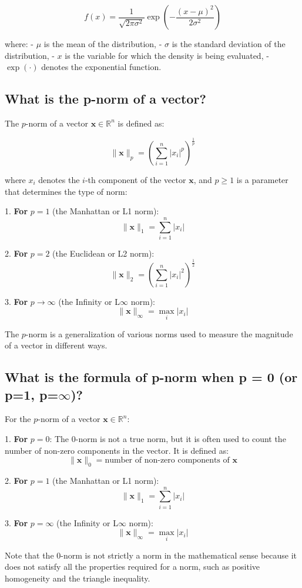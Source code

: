\[
f(x) = \frac{1}{\sqrt{2 \pi \sigma^2}} \exp\left(-\frac{(x - \mu)^2}{2 \sigma^2}\right)
\]

where:
- $\mu$ is the mean of the distribution,
- $\sigma$ is the standard deviation of the distribution,
- $x$ is the variable for which the density is being evaluated,
- $\exp(\cdot)$ denotes the exponential function.

\subsection{What is the p-norm of a vector?}
The $p$-norm of a vector $\mathbf{x} \in \mathbb{R}^n$ is defined as:

\[
\|\mathbf{x}\|_p = \left( \sum_{i=1}^n |x_i|^p \right)^{\frac{1}{p}}
\]

where $x_i$ denotes the $i$-th component of the vector $\mathbf{x}$, and $p \geq 1$ is a parameter that determines the type of norm:

1. \textbf{For} $p = 1$ (the Manhattan or L1 norm):
   \[
   \|\mathbf{x}\|_1 = \sum_{i=1}^n |x_i|
   \]

2. \textbf{For} $p = 2$ (the Euclidean or L2 norm):
   \[
   \|\mathbf{x}\|_2 = \left( \sum_{i=1}^n |x_i|^2 \right)^{\frac{1}{2}}
   \]

3. \textbf{For} $p \to \infty$ (the Infinity or L$\infty$ norm):
   \[
   \|\mathbf{x}\|_\infty = \max_{i} |x_i|
   \]

The $p$-norm is a generalization of various norms used to measure the magnitude of a vector in different ways.


\subsection{What is the formula of p-norm when p = 0 (or p=1, p=$\infty$)?}
For the $p$-norm of a vector $\mathbf{x} \in \mathbb{R}^n$:

1. \textbf{For} $p = 0$:
   The $0$-norm is not a true norm, but it is often used to count the number of non-zero components in the vector. It is defined as:
   \[
   \|\mathbf{x}\|_0 = \text{number of non-zero components of } \mathbf{x}
   \]

2. \textbf{For} $p = 1$ (the Manhattan or L1 norm):
   \[
   \|\mathbf{x}\|_1 = \sum_{i=1}^n |x_i|
   \]

3. \textbf{For} $p = \infty$ (the Infinity or L$\infty$ norm):
   \[
   \|\mathbf{x}\|_\infty = \max_{i} |x_i|
   \]

Note that the $0$-norm is not strictly a norm in the mathematical sense because it does not satisfy all the properties required for a norm, such as positive homogeneity and the triangle inequality.



